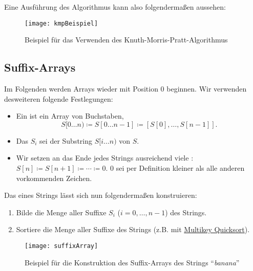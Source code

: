 Eine Ausführung des Algorithmus kann also folgendermaßen aussehen:
\begin{figure}[H]
  \texttt{[image: kmpBeispiel]}
  \caption{Beispiel für das Verwenden des Knuth-Morris-Pratt-Algorithmus}
\end{figure}

\subsection{Suffix-Arrays}

Im Folgenden werden Arrays wieder mit Position \( 0 \) beginnen. Wir verwenden desweiteren folgende Festlegungen:
\begin{itemize}
  \item Ein  ist ein Array von Buchstaben,
  \begin{equation*}
    S[0\dots n) \coloneqq S[0\dots n-1] \coloneqq [S[0],\dots,S[n-1]]\text{.}
  \end{equation*}
  \item Das  \( S_i \) sei der Substring \( S[i\dots n) \) von \( S \).
  \item Wir setzen an das Ende jedes Strings ausreichend viele : \( S[n] \coloneqq S[n+1] \coloneqq \cdots \coloneqq 0 \). \( 0 \) sei per Definition kleiner als alle anderen vorkommenden Zeichen.
\end{itemize}

Das  eines Strings lässt sich nun folgendermaßen konstruieren:

\begin{minipage}{.65\textwidth}
  \begin{enumerate}
    \item Bilde die Menge aller Suffixe \( S_i \) (\( i = 0,\dots,n-1 \)) des Strings.
    \item Sortiere die Menge aller Suffixe des Strings (z.B. mit \hyperref[def:multikeyQuicksort]{Multikey Quicksort}).
  \end{enumerate}
\end{minipage}
\hfill
\begin{minipage}{.35\textwidth}
  \begin{figure}[H]
    \texttt{[image: suffixArray]}
    \caption{Beispiel für die Konstruktion des Suffix-Arrays des Strings ``\emph{banana}''}
  \end{figure}
\end{minipage}

